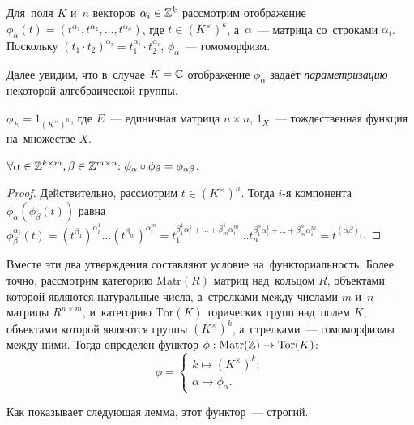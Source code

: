 \documentclass{article}
\begin{document}
Для~поля $K$ и~$n$ векторов $\alpha_i \in \mathbb{Z}^k$ рассмотрим отображение $\phi_\alpha(t) = (t^{\alpha_1}, t^{\alpha_2}, \ldots, t^{\alpha_n})$,
где $t \in (K^\times)^k$, а~$\alpha$~— матрица со~строками $\alpha_i$. Поскольку $(t_1 \cdot t_2)^{\alpha_i} = t_1^{\alpha_i} \cdot t_2^{\alpha_i}$,
$\phi_\alpha$~— гомоморфизм.

Далее увидим, что в~случае $K = \mathbb{C}$ отображение $\phi_\alpha$ задаёт \textit{параметризацию} некоторой алгебраической группы.

\begin{statement*}
    $\phi_{E} = 1_{(K^\times)^n}$, где $E$~— единичная матрица $n \times n$, $1_X$~— тождественная функция на~множестве $X$.
\end{statement*}

\begin{statement*}
    $
        \forall \alpha \in \mathbb{Z}^{k \times m}, \beta \in \mathbb{Z}^{m \times n}{:}\ \phi_\alpha \circ \phi_\beta = \phi_{\alpha \beta}
    $.
\end{statement*}

\begin{proof}
    Действительно, рассмотрим $t \in (K^\times)^n$. Тогда $i$-я компонента $\phi_\alpha(\phi_\beta(t))$
    равна $\phi_\beta^{\alpha_i}(t) = (t^{\beta_1})^{\alpha_i^1} \ldots (t^{\beta_m})^{\alpha_i^m}
                                    = t_1^{\beta_1^1 \alpha_i^1 + \ldots + \beta_m^1 \alpha_i^m}
                                      \ldots
                                      t_n^{\beta_1^n \alpha_i^1 + \ldots + \beta_m^n \alpha_i^m}
                                    = t^{(\alpha \beta)_i}$.
\end{proof}

Вместе эти два утверждения составляют условие на~функториальность. Более точно, рассмотрим категорию
$\mathrm{Matr}(R)$ матриц над~кольцом $R$, объектами которой являются натуральные числа, а~стрелками
между числами $m$ и~$n$~— матрицы $R^{n \times m}$, и~категорию $\mathrm{Tor}(K)$ торических групп над~полем $K$,
объектами которой являются группы $(K^\times)^k$, а~стрелками~— гомоморфизмы между ними.
Тогда определён функтор $\phi : \mathrm{Matr}(\mathbb{Z}) \rightarrow \mathrm{Tor}(K)$:
$$
    \phi = \begin{cases}
        k \mapsto (K^\times)^k; \\
        \alpha \mapsto \phi_\alpha.
    \end{cases}
$$

Как показывает следующая лемма, этот функтор~— строгий.
\end{document}

